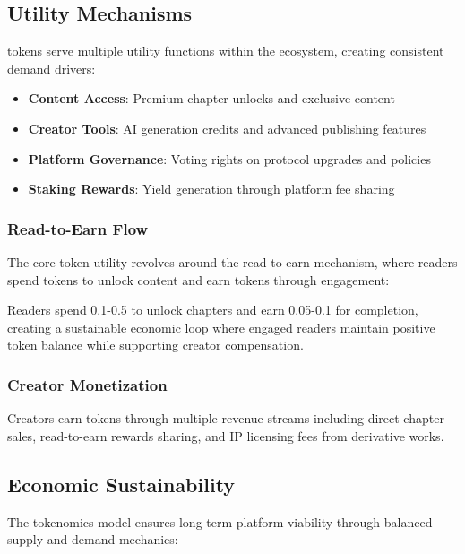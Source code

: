 \subsection{Utility Mechanisms}

\tip{} tokens serve multiple utility functions within the \storyhouse{} ecosystem, creating consistent demand drivers:

\begin{itemize}
    \item \textbf{Content Access}: Premium chapter unlocks and exclusive content
    \item \textbf{Creator Tools}: AI generation credits and advanced publishing features
    \item \textbf{Platform Governance}: Voting rights on protocol upgrades and policies
    \item \textbf{Staking Rewards}: Yield generation through platform fee sharing
\end{itemize}

\subsubsection{Read-to-Earn Flow}

The core token utility revolves around the read-to-earn mechanism, where readers spend tokens to unlock content and earn tokens through engagement:

\begin{innovation}
Readers spend 0.1-0.5 \tip{} to unlock chapters and earn 0.05-0.1 \tip{} for completion, creating a sustainable economic loop where engaged readers maintain positive token balance while supporting creator compensation.
\end{innovation}

\subsubsection{Creator Monetization}

Creators earn \tip{} tokens through multiple revenue streams including direct chapter sales, read-to-earn rewards sharing, and IP licensing fees from derivative works.

\subsection{Economic Sustainability}

The tokenomics model ensures long-term platform viability through balanced supply and demand mechanics:

